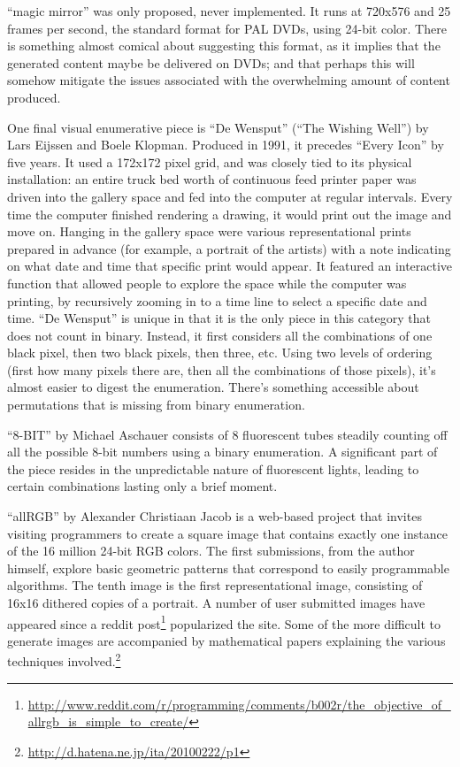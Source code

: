 \documentclass{thesis}
\begin{document}
	``magic mirror'' was only proposed, never implemented. It runs at 720x576 and 25 frames per second, the standard format for PAL DVDs, using 24-bit color. There is something almost comical about suggesting this format, as it implies that the generated content maybe be delivered on DVDs; and that perhaps this will somehow mitigate the issues associated with the overwhelming amount of content produced.
	
	One final visual enumerative piece is ``De Wensput'' (``The Wishing Well'') by Lars Eijssen and Boele Klopman.\cite{remko_scha_every_2001} Produced in 1991, it precedes ``Every Icon'' by five years. It used a 172x172 pixel grid, and was closely tied to its physical installation: an entire truck bed worth of continuous feed printer paper was driven into the gallery space and fed into the computer at regular intervals. Every time the computer finished rendering a drawing, it would print out the image and move on. Hanging in the gallery space were various representational prints prepared in advance (for example, a portrait of the artists) with a note indicating on what date and time that specific print would appear. It featured an interactive function that allowed people to explore the space while the computer was printing, by recursively zooming in to a time line to select a specific date and time. ``De Wensput'' is unique in that it is the only piece in this category that does not count in binary. Instead, it first considers all the combinations of one black pixel, then two black pixels, then three, etc. Using two levels of ordering (first how many pixels there are, then all the combinations of those pixels), it's almost easier to digest the enumeration. There's something accessible about permutations that is missing from binary enumeration.
	
	\cite{michael_aschauer_8-bit_????}
	``8-BIT'' by Michael Aschauer consists of 8 fluorescent tubes steadily counting off all the possible 8-bit numbers using a binary enumeration. A significant part of the piece resides in the unpredictable nature of fluorescent lights, leading to certain combinations lasting only a brief moment.
	
	``allRGB'' by Alexander Christiaan Jacob\cite{alexander_christiaan_jacob_allrgb_2008} is a web-based project that invites visiting programmers to create a square image that contains exactly one instance of the 16 million 24-bit RGB colors. The first submissions, from the author himself, explore basic geometric patterns that correspond to easily programmable algorithms. The tenth image is the first representational image, consisting of 16x16 dithered copies of a portrait. A number of user submitted images have appeared since a reddit post\footnote{\url{http://www.reddit.com/r/programming/comments/b002r/the\_objective\_of\_allrgb\_is\_simple\_to\_create/}} popularized the site. Some of the more difficult to generate images are accompanied by mathematical papers explaining the various techniques involved.\footnote{\url{http://d.hatena.ne.jp/ita/20100222/p1}}
		
\end{document}
